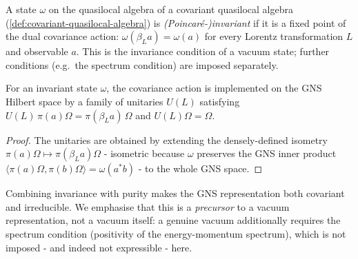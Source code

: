 \begin{definition}
    \label{def:invariant-state}
    \leanok
    A state $\omega$ on the quasilocal algebra of a covariant quasilocal algebra (\ref{def:covariant-quasilocal-algebra}) is \emph{(Poincar\'e-)invariant} if it is a fixed point of the dual covariance action: $\omega(\beta_L a) = \omega(a)$ for every Lorentz transformation $L$ and observable $a$. This is the invariance condition of a vacuum state; further conditions (e.g.\ the spectrum condition) are imposed separately.
\end{definition}

\begin{theorem}
    \label{thrm:invariant-state-gns-unitary}
    \leanok
    For an invariant state $\omega$, the covariance action is implemented on the GNS Hilbert space by a family of unitaries $U(L)$ satisfying $U(L)\,\pi(a)\Omega = \pi(\beta_L a)\,\Omega$ and $U(L)\Omega = \Omega$.
\end{theorem}
\begin{proof}
    \leanok
    The unitaries are obtained by extending the densely-defined isometry $\pi(a)\Omega \mapsto \pi(\beta_L a)\Omega$ - isometric because $\omega$ preserves the GNS inner product $\langle \pi(a)\Omega, \pi(b)\Omega\rangle = \omega(a^* b)$ - to the whole GNS space.
\end{proof}

Combining invariance with purity makes the GNS representation both covariant and irreducible. We emphasise that this is a \emph{precursor} to a vacuum representation, not a vacuum itself: a genuine vacuum additionally requires the spectrum condition (positivity of the energy-momentum spectrum), which is not imposed - and indeed not expressible - here.

